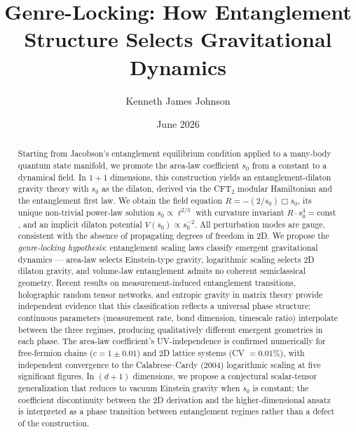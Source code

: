 \documentclass[aps,prd,twocolumn,superscriptaddress,nofootinbib,floatfix]{revtex4-2}
\newcommand{\sn}{s_0}
\newcommand{\dAlem}{\Box}
\begin{document}
\title{Genre-Locking: How Entanglement Structure Selects Gravitational Dynamics}

\author{Kenneth James Johnson}

\date{June 2026}

\begin{abstract}
Starting from Jacobson's entanglement equilibrium condition applied to a many-body quantum state manifold, we promote the area-law coefficient $\sn$ from a constant to a dynamical field. In $1{+}1$ dimensions, this construction yields an entanglement-dilaton gravity theory with $\sn$ as the dilaton, derived via the CFT$_2$ modular Hamiltonian and the entanglement first law. We obtain the field equation $R = -(2/\sn)\dAlem\sn$, its unique non-trivial power-law solution $\sn \propto \ell^{2/3}$ with curvature invariant $R \cdot \sn^3 = \mathrm{const}$, and an implicit dilaton potential $V(\sn) \propto \sn^{-2}$. All perturbation modes are gauge, consistent with the absence of propagating degrees of freedom in 2D. We propose the \emph{genre-locking hypothesis}: entanglement scaling laws classify emergent gravitational dynamics --- area-law selects Einstein-type gravity, logarithmic scaling selects 2D dilaton gravity, and volume-law entanglement admits no coherent semiclassical geometry. Recent results on measurement-induced entanglement transitions, holographic random tensor networks, and entropic gravity in matrix theory provide independent evidence that this classification reflects a universal phase structure: continuous parameters (measurement rate, bond dimension, timescale ratio) interpolate between the three regimes, producing qualitatively different emergent geometries in each phase. The area-law coefficient's UV-independence is confirmed numerically for free-fermion chains ($c = 1 \pm 0.01$) and 2D lattice systems (CV $= 0.01\%$), with independent convergence to the Calabrese--Cardy (2004) logarithmic scaling at five significant figures. In $(d{+}1)$ dimensions, we propose a conjectural scalar-tensor generalization that reduces to vacuum Einstein gravity when $\sn$ is constant; the coefficient discontinuity between the 2D derivation and the higher-dimensional ansatz is interpreted as a phase transition between entanglement regimes rather than a defect of the construction.
\end{abstract}

\maketitle
\end{document}

